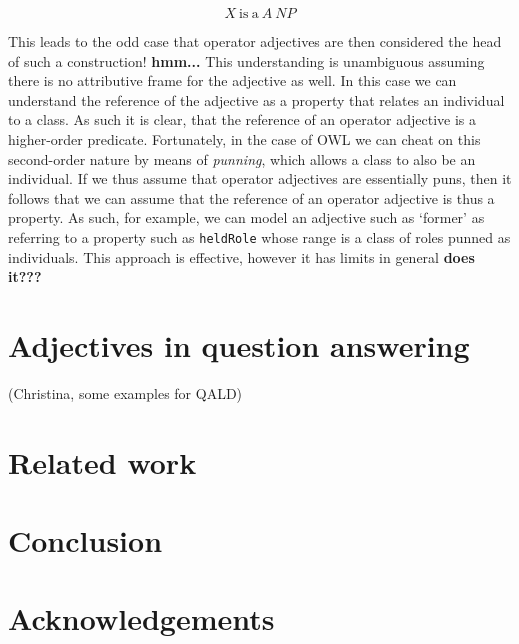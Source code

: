 \documentclass[11pt]{article}
\begin{document}
$$X\mathrm{~is~a~}A~NP$$

This leads to the odd case that operator adjectives are then considered the head of such a construction! \textbf{hmm...} This understanding is unambiguous assuming there is no attributive frame for the adjective as well. In this case we can understand the reference of the adjective as a property that relates an individual to a class. As such it is clear, that the reference of an operator adjective is a higher-order predicate. Fortunately, in the case of OWL we can cheat on this second-order nature by means of \emph{punning}, which allows a class to also be an individual. If we thus assume that operator adjectives are essentially puns, then it follows that we can assume that the reference of an operator adjective is thus a property. As such, for example, we can model an adjective such as `former' as referring to a property such as {\tt heldRole} whose range is a class of roles punned as individuals. This approach is effective, however it has limits in general \textbf{does it???}

\section{Adjectives in question answering}

(Christina, some examples for QALD)

\section{Related work}

\section{Conclusion}

\section*{Acknowledgements}



\end{document}
